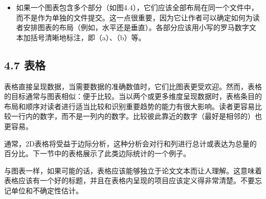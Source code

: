 \begin{itemize}
\item 如果一个图表包含多个部分（如图4.4），它们应该全部布局在同一个文件中，而不是作为单独的文件提交。这一点很重要，因为它让作者可以确定如何为读者安排图表的布局（例如，水平还是垂直）。各部分应该用小写的罗马数字文本加括号清晰地标注，即（a）、（b）等。
\end{itemize}

\subsection*{4.7 表格}
表格直接呈现数据，当需要数据的准确数值时，它们比图表更受欢迎。然而，表格的目标通常与图表相似：便于比较。当以两个或更多维度呈现数据时，表格条目的布局和顺序对读者进行适当比较和识别重要趋势的能力有很大影响。读者更容易比较一行内的数字，而不是一列内的数字。比较彼此靠近的数字（最好是相邻的）也更容易。

通常，2D表格将受益于边际分析，这种分析会对行和列进行总计或表达为总量的百分比。下一节中的表格展示了此类边际统计的一个例子。

与图表一样，如果可能的话，表格应该能够独立于论文文本而让人理解。这意味着表格应该有一个好的标题，并且在表格内呈现的项目应该定义得非常清楚。不要忘记单位和不确定性估计。

